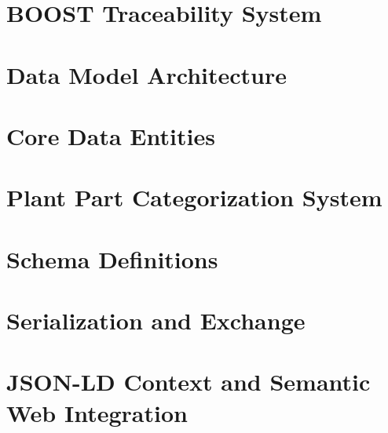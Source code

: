 \documentclass{article}
\begin{document}
\section{BOOST Traceability System}
\label{sec:traceability-system}


\section{Data Model Architecture}
\label{sec:data-model}


\section{Core Data Entities}
\label{sec:complete-entities}









\section{Plant Part Categorization System}
\label{sec:plant-parts}



\section{Schema Definitions}
\label{sec:schema-definitions}


\section{Serialization and Exchange}
\label{sec:serialization}


\section{JSON-LD Context and Semantic Web Integration}
\label{sec:jsonld-context}

\end{document}
